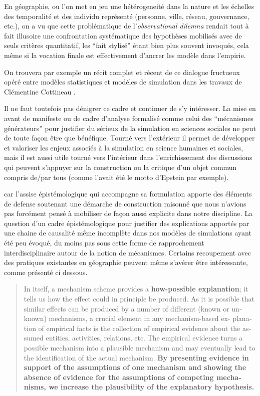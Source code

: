 En géographie, ou l'on met en jeu une hétérogeneité dans la nature et les échelles des temporalité et des individu représenté (personne, ville, réseau, gouvernance, etc.), on a vu que cette problématique de l'\textit{observational dilemna} rendait tout à fait illusoire une confrontation systématique des hypothèses mobilisés avec de seuls critères quantitatif, les \enquote{fait stylisé} étant bien plus souvent invoqués, cela même si la vocation finale est effectivement d'ancrer les modèle dans l'empirie.


On trouvera par exemple un récit complet et récent de ce dialogue fructueux opéré entre modèles statistiques et modèles de simulation dans les travaux de Clémentine Cottineau \autocite{Cottineau2014}.







Il ne faut toutefois pas dénigrer ce cadre et continuer de s'y intéresser. La mise en avant de manifeste \textcite{Conte2012} ou de cadre d'analyse formalisé comme celui des \enquote{mécanismes générateurs} pour justifier du sérieux de la simulation en sciences sociales ne peut de toute façon être que bénéfique. Tourné vers l'extérieur il permet de développer et valoriser les enjeux associés à la simulation en science humaines et sociales, mais il est aussi utile tourné vers l'intérieur dans l'enrichissement des discussions qui peuvent s'appuyer sur la construction ou la critique d'un objet commun compris de/par tous (comme l'avait été le motto d'Epstein par exemple).

 car l'assise épistémologique qui accompagne sa formulation apporte des éléments de defense soutenant une démarche de construction raisonné que nous n'avions pas forcément pensé à mobiliser de façon aussi explicite dans notre discipline. La question d'un cadre épistémologique pour justifier des explications apportés par une chaine de causalité même incomplète dans nos modèles de simulations ayant été peu évoqué, du moins pas sous cette forme de rapprochement interdisciplinaire autour de la notion de mécanismes. Certains recoupement avec des pratiques existantes en géographie peuvent même s'avérer être intéressante, comme présenté ci dessous.

\foreignblockquote{english}[\cite{Hedstrom2010}]{In itself, a mechanism scheme provides a \textbf{how-possible explanation}; it tells us how the effect could in principle be produced. As it is possible that similar effects can be produced by a number of different (known or unknown) mechanisms, a crucial element in any mechanism-based ex- planation of empirical facts is the collection of empirical evidence about the assumed entities, activities, relations, etc. The empirical evidence turns a possible mechanism into a plausible mechanism and may eventually lead to the identification of the actual mechanism. \textbf{By presenting evidence in support of the assumptions of one mechanism and showing the absence of evidence for the assumptions of competing mechanisms, we increase the plausibility of the explanatory hypothesis.}} 

